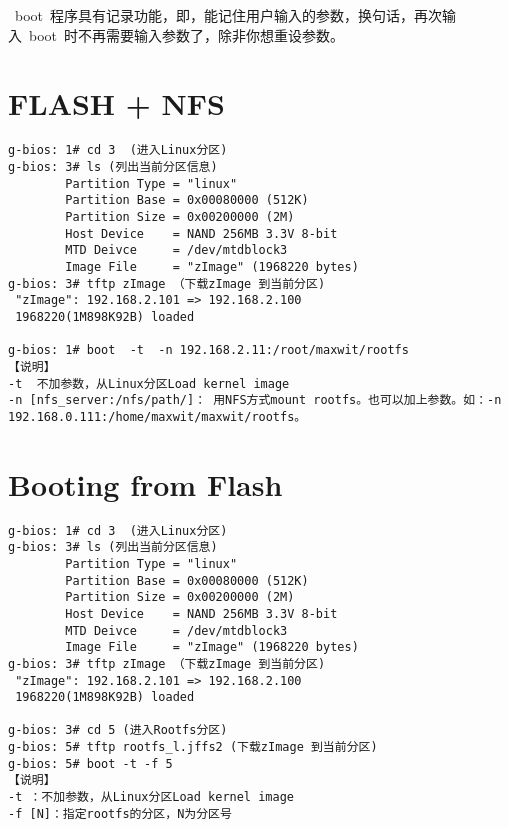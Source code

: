 ~boot~程序具有记录功能，即，能记住用户输入的参数，换句话，再次输入~boot~时不再需要输入参数了，除非你想重设参数。

\section{FLASH + NFS}
\begin{verbatim}
g-bios: 1# cd 3  (进入Linux分区)
g-bios: 3# ls (列出当前分区信息)
        Partition Type = "linux"
        Partition Base = 0x00080000 (512K)
        Partition Size = 0x00200000 (2M)
        Host Device    = NAND 256MB 3.3V 8-bit
        MTD Deivce     = /dev/mtdblock3
        Image File     = "zImage" (1968220 bytes)
g-bios: 3# tftp zImage （下载zImage 到当前分区)
 "zImage": 192.168.2.101 => 192.168.2.100
 1968220(1M898K92B) loaded

g-bios: 1# boot  -t  -n 192.168.2.11:/root/maxwit/rootfs
【说明】
-t  不加参数，从Linux分区Load kernel image
-n [nfs_server:/nfs/path/]： 用NFS方式mount rootfs。也可以加上参数。如：-n 192.168.0.111:/home/maxwit/maxwit/rootfs。
\end{verbatim}

\section{Booting from Flash}

\begin{verbatim}
g-bios: 1# cd 3  (进入Linux分区)
g-bios: 3# ls (列出当前分区信息)
        Partition Type = "linux"
        Partition Base = 0x00080000 (512K)
        Partition Size = 0x00200000 (2M)
        Host Device    = NAND 256MB 3.3V 8-bit
        MTD Deivce     = /dev/mtdblock3
        Image File     = "zImage" (1968220 bytes)
g-bios: 3# tftp zImage （下载zImage 到当前分区)
 "zImage": 192.168.2.101 => 192.168.2.100
 1968220(1M898K92B) loaded

g-bios: 3# cd 5 (进入Rootfs分区)
g-bios: 5# tftp rootfs_l.jffs2 (下载zImage 到当前分区)
g-bios: 5# boot -t -f 5
【说明】
-t ：不加参数，从Linux分区Load kernel image
-f [N]：指定rootfs的分区，N为分区号
\end{verbatim}
